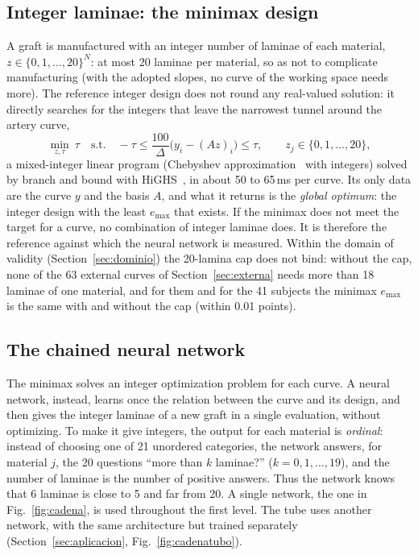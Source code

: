 \subsection{Integer laminae: the minimax design}\label{sec:minimax}
A graft is manufactured with an integer number of laminae of each material, $z\in\{0,1,\ldots,20\}^N$: at most 20 laminae per material, so as not to complicate manufacturing (with the adopted slopes, no curve of the working space needs more). The reference integer design does not round any real-valued solution: it directly searches for the integers that leave the narrowest tunnel around the artery curve,
\[
\min_{z,\tau}\ \tau\quad\text{s.t.}\quad -\tau\le\frac{100}{\Delta}\bigl(y_i-(Az)_i\bigr)\le\tau,\qquad z_j\in\{0,1,\ldots,20\},
\]
a mixed-integer linear program (Chebyshev approximation~\cite{cheney} with integers) solved by branch and bound with HiGHS~\cite{highs}, in about 50 to 65\,ms per curve. Its only data are the curve $y$ and the basis $A$, and what it returns is the \emph{global optimum}: the integer design with the least $e_{\max}$ that exists. If the minimax does not meet the target for a curve, no combination of integer laminae does. It is therefore the reference against which the neural network is measured. Within the domain of validity (Section~\ref{sec:dominio}) the 20-lamina cap does not bind: without the cap, none of the 63 external curves of Section~\ref{sec:externa} needs more than 18 laminae of one material, and for them and for the 41 subjects the minimax $e_{\max}$ is the same with and without the cap (within 0.01 points).

\subsection{The chained neural network}\label{sec:enteros}
The minimax solves an integer optimization problem for each curve. A neural network, instead, learns once the relation between the curve and its design, and then gives the integer laminae of a new graft in a single evaluation, without optimizing. To make it give integers, the output for each material is \emph{ordinal}: instead of choosing one of 21 unordered categories, the network answers, for material $j$, the 20 questions ``more than $k$ laminae?'' ($k=0,1,\ldots,19$), and the number of laminae is the number of positive answers. Thus the network knows that 6 laminae is close to 5 and far from 20. A single network, the one in Fig.~\ref{fig:cadena}, is used throughout the first level. The tube uses another network, with the same architecture but trained separately (Section~\ref{sec:aplicacion}, Fig.~\ref{fig:cadenatubo}).

